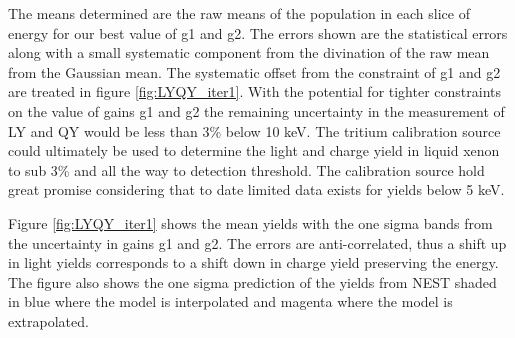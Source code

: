 \renewcommand{\baselinestretch}{2}
\small\normalsize

The means determined are the raw means of the population in each slice of energy for our best value of g1 and g2. The errors shown are the statistical errors along with a small systematic component from the divination of the raw mean from the Gaussian mean. The systematic offset from the constraint of g1 and g2 are treated in figure \ref{fig:LYQY_iter1}. With the potential for tighter constraints on the value of gains g1 and g2 the remaining uncertainty in the measurement of LY and QY would be less than 3\% below 10 keV. The tritium calibration source could ultimately be used to determine the light and charge yield in liquid xenon to sub 3\% and all the way to detection threshold. The calibration source hold great promise considering that to date limited data exists for yields below 5 keV. 

Figure \ref{fig:LYQY_iter1} shows the mean yields with the one sigma bands from the uncertainty in gains g1 and g2. The errors are anti-correlated, thus a shift up in light yields corresponds to a shift down in charge yield preserving the energy. The figure also shows the one sigma prediction of the yields from NEST \cite{NEST_2013} shaded in blue where the model is interpolated and magenta where the model is extrapolated. 


